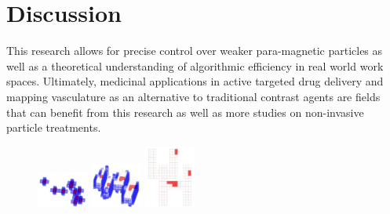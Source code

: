 \documentclass[letterpaper, 9 pt, conference]{ieeeconf}  %
\begin{document}
\section{Discussion}\label{sec:Discussion}
	This research allows for precise control over weaker para-magnetic particles as well as a theoretical understanding of algorithmic efficiency in real world work spaces. Ultimately, medicinal applications in active targeted drug delivery and mapping vasculature as an alternative to traditional contrast agents are fields that can benefit from this research as well as more studies on non-invasive particle treatments. 
\begin{figure}
	\vspace{-20pt}

	\includegraphics[width=0.15\textwidth]{3D_initial}
	\includegraphics[width=0.15\textwidth]{3D_middle}
	\includegraphics[width=0.15\textwidth]{3D_final}

\end{figure}
\end{document}
